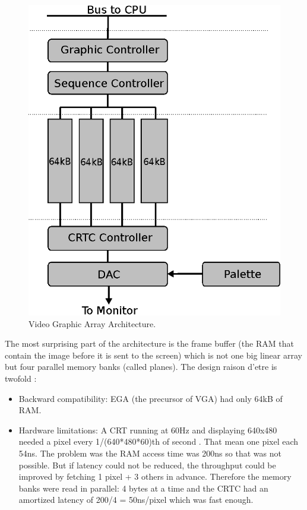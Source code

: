 \documentclass[book.tex]{subfiles}
\begin{document}
\begin{figure}[H]
\centering
\includegraphics[scale=1.2]{imgs/vga.eps}
\caption{Video Graphic Array Architecture.}
\label{fig:vga_arch}
\end{figure}



The most surprising part of the architecture is the frame buffer (the RAM that contain the image before it is sent to the screen) which is not one big linear array but four parallel memory banks (called planes). The design raison d'etre is twofold :

\begin{itemize}



\item Backward compatibility: EGA (the precursor of VGA) had only 64kB of RAM.
\item Hardware limitations: A CRT running at 60Hz and displaying 640x480 needed a pixel every 1/(640*480*60)th of second . That mean one pixel each 54ns. The problem was the RAM access time was 200ns so that was not possible. But if latency could not be reduced, the throughput could be improved by fetching 1 pixel + 3 others in advance. Therefore the memory banks were read in parallel: 4 bytes at a time and the CRTC had an amortized latency of 200/4 = 50ns/pixel which was fast enough.
\end{itemize}
\end{document}
